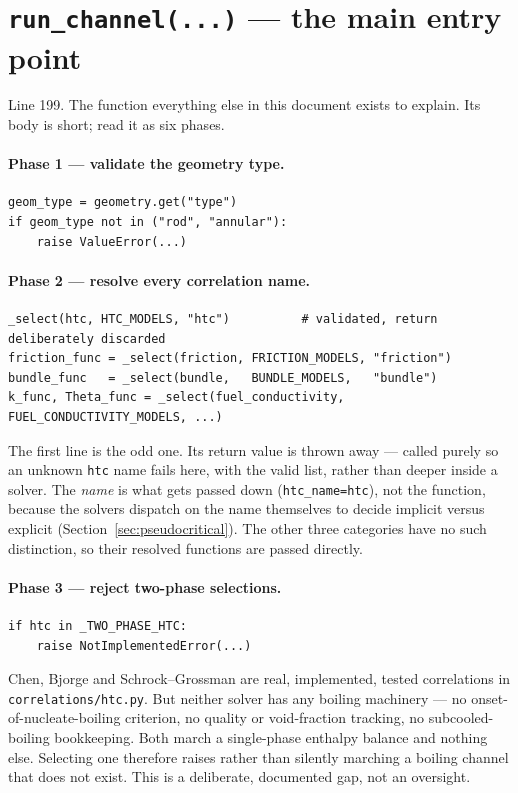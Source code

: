 \documentclass[11pt]{article}
\newcommand{\code}[1]{\texttt{#1}}
\begin{document}
\section{\code{run\_channel(...)} --- the main entry point}
Line 199. The function everything else in this document exists to explain. Its body is
short; read it as six phases.

\paragraph{Phase 1 --- validate the geometry type.}
\begin{lstlisting}
geom_type = geometry.get("type")
if geom_type not in ("rod", "annular"):
    raise ValueError(...)
\end{lstlisting}

\paragraph{Phase 2 --- resolve every correlation name.}
\begin{lstlisting}
_select(htc, HTC_MODELS, "htc")          # validated, return deliberately discarded
friction_func = _select(friction, FRICTION_MODELS, "friction")
bundle_func   = _select(bundle,   BUNDLE_MODELS,   "bundle")
k_func, Theta_func = _select(fuel_conductivity, FUEL_CONDUCTIVITY_MODELS, ...)
\end{lstlisting}

The first line is the odd one. Its return value is thrown away --- called purely so an
unknown \code{htc} name fails here, with the valid list, rather than deeper inside a
solver. The \emph{name} is what gets passed down (\code{htc\_name=htc}), not the
function, because the solvers dispatch on the name themselves to decide implicit versus
explicit (Section~\ref{sec:pseudocritical}). The other three categories have no such
distinction, so their resolved functions are passed directly.

\paragraph{Phase 3 --- reject two-phase selections.}
\label{sec:twophase}
\begin{lstlisting}
if htc in _TWO_PHASE_HTC:
    raise NotImplementedError(...)
\end{lstlisting}
Chen, Bjorge and Schrock--Grossman are real, implemented, tested correlations in
\code{correlations/htc.py}. But neither solver has any boiling machinery --- no
onset-of-nucleate-boiling criterion, no quality or void-fraction tracking, no
subcooled-boiling bookkeeping. Both march a single-phase enthalpy balance and nothing
else. Selecting one therefore raises rather than silently marching a boiling channel
that does not exist. This is a deliberate, documented gap, not an oversight.
\end{document}
